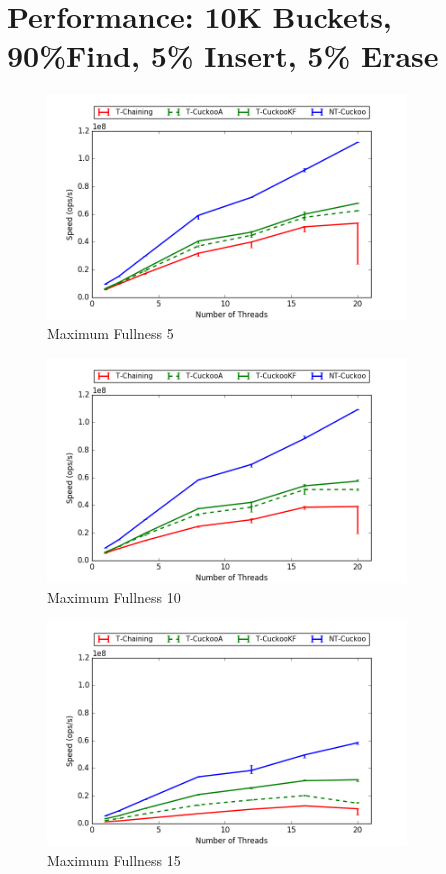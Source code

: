 \section{Performance: 10K Buckets, 90\%Find, 5\% Insert, 5\% Erase}
\begin{figure}[H]
    \centering
	\includegraphics[width=0.85\textwidth]{maps/5HM10K:F90,I5,E5.png} 
        \caption*{Maximum Fullness 5}
    \end{figure}
\begin{figure}[H]
    \centering
	\includegraphics[width=0.85\textwidth]{maps/10HM10K:F90,I5,E5.png} 
        \caption*{Maximum Fullness 10}
    \end{figure}
\begin{figure}[H]
    \centering
	\includegraphics[width=0.85\textwidth]{maps/15HM1M:F90,I5,E5.png} 
        \caption*{Maximum Fullness 15}
    \end{figure}

